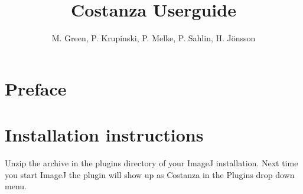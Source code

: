 \documentclass[a4paper,12pt]{article}
\title{Costanza Userguide}
\author{M. Green, P. Krupinski, P. Melke, P. Sahlin, H. Jönsson}
\begin{document}
\maketitle


\section{Preface}

\section{Installation instructions}

Unzip the archive in the plugins directory of your ImageJ installation. Next
time you start ImageJ the plugin will show up as Costanza in the Plugins drop
down menu.
\end{document}
